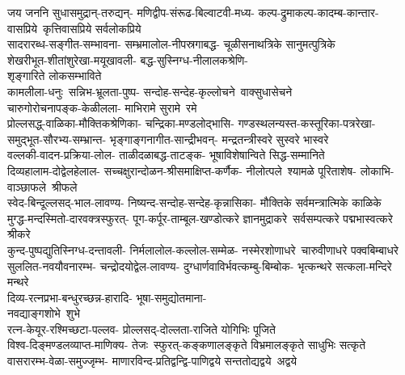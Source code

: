\begin{multicols}{2}
\begin{flushleft}
जय जननि सुधासमुद्रान्-तरुद्यन्-
मणिद्वीप-संरूढ-बिल्वाटवी-मध्य-
कल्प-द्रुमाकल्प-कादम्ब-कान्तार-
वासप्रिये~कृत्तिवासप्रिये सर्वलोकप्रिये\\
\medskip
सादरारब्ध-सङ्गीत-सम्भावना-
सम्भ्रमालोल-नीपस्रगाबद्ध-
चूळीसनाथत्रिके सानुमत्पुत्रिके\\
\medskip
शेखरीभूत-शीतांशुरेखा-मयूखावली-
बद्ध-सुस्निग्ध-नीलालकश्रेणि-\\
शृङ्गारिते लोकसम्भाविते\\
\medskip
\mbox{कामलीला-धनुः~सन्निभ-भ्रूलता-पुष्प-}
\mbox{सन्दोह-सन्देह-कृल्लोचने~वाक्सुधासेचने}\\
\medskip
चारुगोरोचनापङ्क-केळीलला-
माभिरामे सुरामे~रमे\\
\medskip
प्रोल्लसद्ध्-वाळिका-मौक्तिकश्रेणिका-
चन्द्रिका-मण्डलोद्भासि-
गण्डस्थलन्यस्त-कस्तूरिका-पत्ररेखा-
समुद्भूत-सौरभ्य-सम्भ्रान्त-
भृङ्गाङ्गनागीत-सान्द्रीभवन्-
मन्द्रतन्त्रीस्वरे सुस्वरे भास्वरे\\
\medskip
वल्लकी-वादन-प्रक्रिया-लोल-
ताळीदळाबद्ध-ताटङ्क-
भूषाविशेषान्विते सिद्ध-सम्मानिते\\
\medskip
दिव्यहालाम-दोद्वेलहेलाल-
सच्चक्षुरान्दोळन-श्रीसमाक्षिप्त-कर्णैक-
नीलोत्पले~श्यामळे पूरिताशेष-
लोकाभि-वाञ्छाफले~श्रीफले\\
\medskip
स्वेद-बिन्दूल्लसद्-भाल-लावण्य-
निष्यन्द-सन्दोह-सन्देह-कृन्नासिका-
मौक्तिके सर्वमन्त्रात्मिके काळिके\\
\medskip
मुग्द्ध-मन्दस्मितो-दारवक्त्रस्फुरत्-
पूग-कर्पूर-ताम्बूल-खण्डोत्करे 
ज्ञानमुद्राकरे~सर्वसम्पत्करे
पद्मभास्वत्करे श्रीकरे\\
\medskip
कुन्द-पुष्पद्युतिस्निग्ध-दन्तावली-
निर्मलालोल-कल्लोल-सम्मेळ-
नस्मेरशोणाधरे~चारुवीणाधरे पक्वबिम्बाधरे\\
\medskip
सुललित-नवयौवनारम्भ-
चन्द्रोदयोद्वेल-लावण्य-
दुग्धार्णवाविर्भवत्कम्बु-बिम्बोक-
भृत्कन्थरे सत्कला-मन्दिरे मन्थरे\\
\medskip
दिव्य-रत्नप्रभा-बन्धुरच्छन्न-हारादि-
भूषा-समुद्योतमाना-\\
नवद्याङ्गशोभे~शुभे\\
\medskip
रत्न-केयूर-रश्मिच्छटा-पल्लव-
प्रोल्लसद्-दोल्लता-राजिते योगिभिः पूजिते\\
\medskip
विश्व-दिङ्मण्डलव्याप्त-माणिक्य-
तेजः~स्फुरत्-कङ्कणालङ्कृते 
विभ्रमालङ्कृते साधुभिः सत्कृते\\
\medskip
वासरारम्भ-वेळा-समुज्जृम्भ-
माणारविन्द-प्रतिद्वन्द्वि-पाणिद्वये
सन्ततोद्यद्वये~अद्वये\\

\end{flushleft}
\end{multicols}
